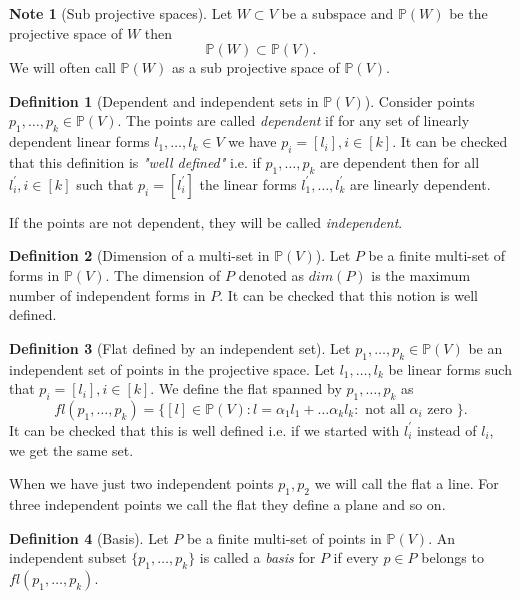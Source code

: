 \documentclass[12pt]{caltech_thesis}
\theoremstyle{plain}
\theoremstyle{definition}
\newtheorem{definition}{Definition}
\newtheorem{note}{Note}
\newcommand{\PP}{\mathbb{P}}
\begin{document}
\begin{note}[Sub projective spaces]\label{note:subprojectivespace}
Let $W\subset V$ be a subspace and $\PP(W)$ be the projective space of $W$ then 
\[
 \PP(W)\subset \PP(V).
\]
We will often call $\PP(W)$ as a sub projective space of $\PP(V)$. 
\end{note}




\begin{definition}[Dependent and independent sets in $\PP(V)$]\label{defn:dependentpoints}
Consider points $p_1,\ldots,p_k \in \PP(V)$. The points are called \emph{dependent} if for any set of linearly dependent linear forms 
$l_1,\ldots,l_k \in V$ we have $p_i = [l_i], i\in [k]$.
It can be checked that this definition is \emph{"well defined"} i.e. if $p_1,\ldots,p_k$ are dependent then for all $l_i^\prime, i\in [k]$ 
 such that $p_i = [l_i^\prime]$ the linear forms $l_1^\prime,\ldots, l_k^\prime$ are linearly dependent.

If the points are not dependent, they will be called \emph{independent}.
\end{definition}



\begin{definition}[Dimension of a multi-set in $\PP(V)$]\label{defn:dimension}
 Let $P$ be a finite multi-set of forms in $\PP(V)$. The dimension of $P$ denoted as $dim(P)$ is the maximum number of independent forms in $P$.
 It can be checked that this notion is well defined.
\end{definition}

\begin{definition}[Flat defined by an independent set]\label{defn:flat}
 Let $p_1,\ldots,p_k \in \PP(V)$ be an independent set of points in the projective space. Let $l_1,\ldots,l_k$ be linear forms
 such that $p_i=[l_i], i\in [k]$. We define the flat
 spanned by $p_1,\ldots,p_k$ as
 \[
  fl(p_1,\ldots,p_k) = \{ [l] \in \PP(V) : l  = \alpha_1 l _1 + \ldots \alpha_k l_k : \text{ not all }\alpha_i \text{ zero } \}.
 \]
It can be checked that this is well defined i.e. if we started with $l_i^\prime$ instead of $l_i$, we get the same set.

When we have just two independent points $p_1,p_2$ we will call the flat a line. For three independent points
we call the flat they define a plane and so on.
\end{definition}



\begin{definition}[Basis]\label{defn:basis}
 Let $P$ be a finite multi-set of points in $\PP(V)$. An independent subset $\{p_1,\ldots,p_k\}$ is called a \emph{basis}
 for $P$ if every $p\in P$ belongs to $fl(p_1,\ldots,p_k)$.
\end{definition}
\end{document}
